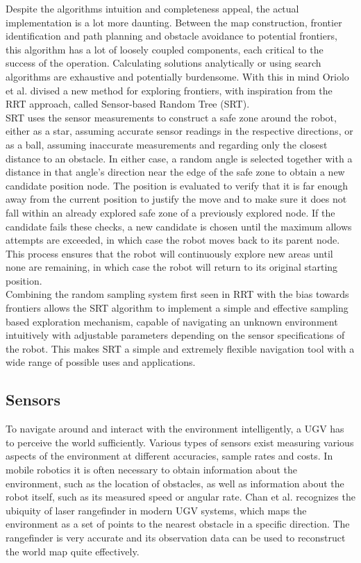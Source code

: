 Despite the algorithms intuition and completeness appeal, the actual implementation is a lot more daunting. Between the map construction, frontier identification and path planning and obstacle avoidance to potential frontiers, this algorithm has a lot of loosely coupled components, each critical to the success of the operation. Calculating solutions analytically or using search algorithms are exhaustive and potentially burdensome. With this in mind Oriolo et al. \cite{1302457} divised a new method for exploring frontiers, with inspiration from the RRT approach, called Sensor-based Random Tree (SRT). \\

SRT uses the sensor measurements to construct a safe zone around the robot, either as a star, assuming accurate sensor readings in the respective directions, or as a ball, assuming inaccurate measurements and regarding only the closest distance to an obstacle. In either case, a random angle is selected together with a distance in that angle's direction near the edge of the safe zone to obtain a new candidate position node. The position is evaluated to verify that it is far enough away from the current position to justify the move and to make sure it does not fall within an already explored safe zone of a previously explored node. If the candidate fails these checks, a new candidate is chosen until the maximum allows attempts are exceeded, in which case the robot moves back to its parent node. This process ensures that the robot will continuously explore new areas until none are remaining, in which case the robot will return to its original starting position. \\

Combining the random sampling system first seen in RRT with the bias towards frontiers allows the SRT algorithm to implement a simple and effective sampling based exploration mechanism, capable of navigating an unknown environment intuitively with adjustable parameters depending on the sensor specifications of the robot. This makes SRT a simple and extremely flexible navigation tool with a wide range of possible uses and applications.

\subsection{Sensors}

To navigate around and interact with the environment intelligently, a UGV has to perceive the world sufficiently. Various types of sensors exist measuring various aspects of the environment at different accuracies, sample rates and costs. In mobile robotics it is often necessary to obtain information about the environment, such as the location of obstacles, as well as information about the robot itself, such as its measured speed or angular rate. Chan et al. \cite{8616217} recognizes the ubiquity of laser rangefinder in modern UGV systems, which maps the environment as a set of points to the nearest obstacle in a specific direction. The rangefinder is very accurate and its observation data can be used to reconstruct the world map quite effectively. \\

